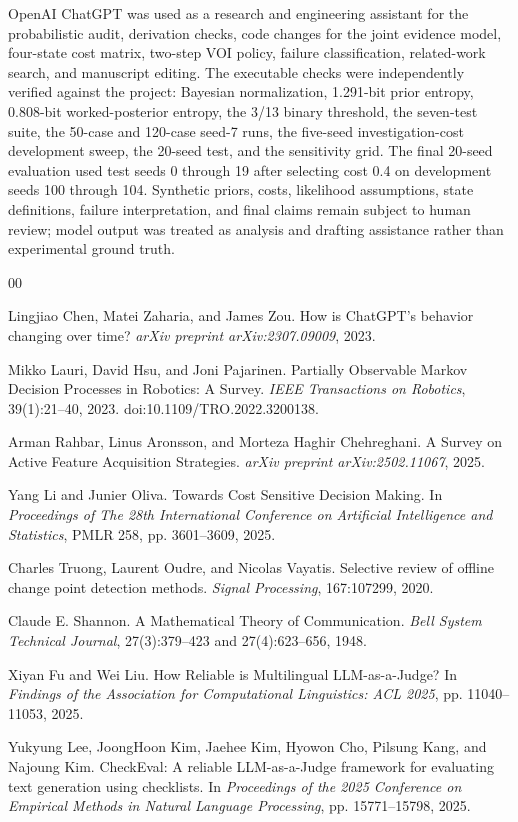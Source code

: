 \documentclass{article}
\begin{document}
OpenAI ChatGPT was used as a research and engineering assistant for the probabilistic audit, derivation checks, code changes for the joint evidence model, four-state cost matrix, two-step VOI policy, failure classification, related-work search, and manuscript editing. The executable checks were independently verified against the project: Bayesian normalization, 1.291-bit prior entropy, 0.808-bit worked-posterior entropy, the 3/13 binary threshold, the seven-test suite, the 50-case and 120-case seed-7 runs, the five-seed investigation-cost development sweep, the 20-seed test, and the sensitivity grid. The final 20-seed evaluation used test seeds 0 through 19 after selecting cost 0.4 on development seeds 100 through 104. Synthetic priors, costs, likelihood assumptions, state definitions, failure interpretation, and final claims remain subject to human review; model output was treated as analysis and drafting assistance rather than experimental ground truth.

\begin{thebibliography}{00}

Lingjiao Chen, Matei Zaharia, and James Zou. How is ChatGPT's behavior changing over time? \emph{arXiv preprint arXiv:2307.09009}, 2023.

Mikko Lauri, David Hsu, and Joni Pajarinen. Partially Observable Markov Decision Processes in Robotics: A Survey. \emph{IEEE Transactions on Robotics}, 39(1):21--40, 2023. doi:10.1109/TRO.2022.3200138.

Arman Rahbar, Linus Aronsson, and Morteza Haghir Chehreghani. A Survey on Active Feature Acquisition Strategies. \emph{arXiv preprint arXiv:2502.11067}, 2025.

Yang Li and Junier Oliva. Towards Cost Sensitive Decision Making. In \emph{Proceedings of The 28th International Conference on Artificial Intelligence and Statistics}, PMLR 258, pp. 3601--3609, 2025.

Charles Truong, Laurent Oudre, and Nicolas Vayatis. Selective review of offline change point detection methods. \emph{Signal Processing}, 167:107299, 2020.

Claude E. Shannon. A Mathematical Theory of Communication. \emph{Bell System Technical Journal}, 27(3):379--423 and 27(4):623--656, 1948.

Xiyan Fu and Wei Liu. How Reliable is Multilingual LLM-as-a-Judge? In \emph{Findings of the Association for Computational Linguistics: ACL 2025}, pp. 11040--11053, 2025.

Yukyung Lee, JoongHoon Kim, Jaehee Kim, Hyowon Cho, Pilsung Kang, and Najoung Kim. CheckEval: A reliable LLM-as-a-Judge framework for evaluating text generation using checklists. In \emph{Proceedings of the 2025 Conference on Empirical Methods in Natural Language Processing}, pp. 15771--15798, 2025.

\end{thebibliography}
\end{document}
